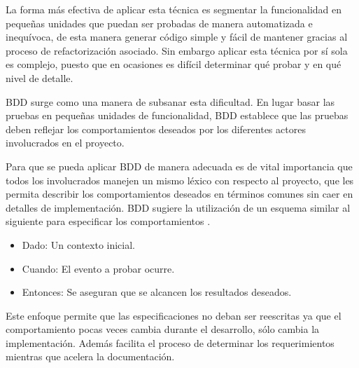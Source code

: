 La forma más efectiva de aplicar esta técnica es segmentar la funcionalidad en pequeñas unidades que puedan ser probadas de manera automatizada e inequívoca, de esta manera generar código simple y fácil de mantener gracias al proceso de refactorización asociado. Sin embargo aplicar esta técnica por sí sola es complejo, puesto que en ocasiones es difícil determinar qué probar y en qué nivel de detalle.

BDD surge como una manera de subsanar esta dificultad. En lugar basar las pruebas en pequeñas unidades de funcionalidad, BDD establece que las pruebas deben reflejar los comportamientos deseados por los diferentes actores involucrados en el proyecto. 

Para que se pueda aplicar BDD de manera adecuada es de vital importancia que todos los involucrados manejen un mismo léxico con respecto al proyecto, que les permita describir los comportamientos deseados en términos comunes sin caer en detalles de implementación. BDD sugiere la utilización de un esquema similar al siguiente para especificar los comportamientos \cite{IBDD}.

\begin{itemize}
\item Dado: Un contexto inicial.
\item Cuando: El evento a probar ocurre.
\item Entonces: Se aseguran que se alcancen los resultados deseados.
\end{itemize}

Este enfoque permite que las especificaciones no deban ser reescritas ya que el comportamiento pocas veces cambia durante el desarrollo, sólo cambia la implementación. Además facilita el proceso de determinar los requerimientos mientras que acelera la documentación.



 

